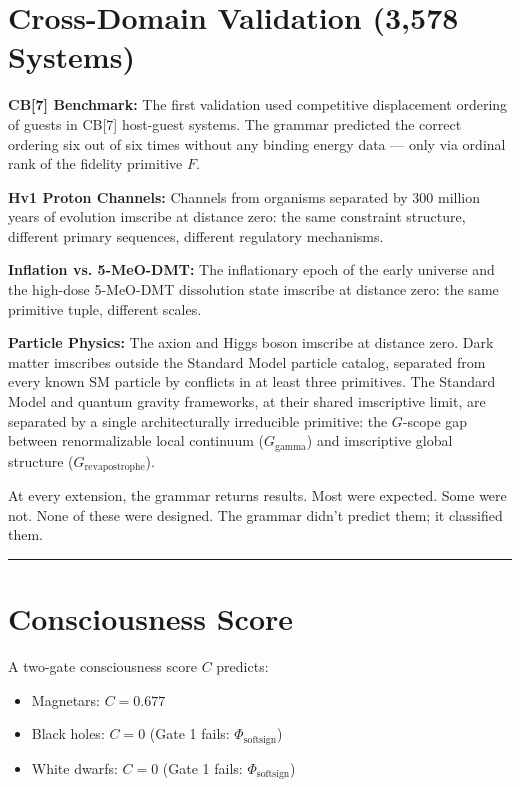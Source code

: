 \documentclass[12pt,a4paper]{article}
\begin{document}
\section{Cross-Domain Validation (3,578 Systems)}

\textbf{CB[7] Benchmark:} The first validation used competitive displacement ordering of guests in CB[7] host-guest systems. The grammar predicted the correct ordering six out of six times without any binding energy data --- only via ordinal rank of the fidelity primitive $F$.

\textbf{Hv1 Proton Channels:} Channels from organisms separated by 300 million years of evolution imscribe at distance zero: the same constraint structure, different primary sequences, different regulatory mechanisms.

\textbf{Inflation vs. 5-MeO-DMT:} The inflationary epoch of the early universe and the high-dose 5-MeO-DMT dissolution state imscribe at distance zero: the same primitive tuple, different scales.

\textbf{Particle Physics:} The axion and Higgs boson imscribe at distance zero. Dark matter imscribes outside the Standard Model particle catalog, separated from every known SM particle by conflicts in at least three primitives. The Standard Model and quantum gravity frameworks, at their shared imscriptive limit, are separated by a single architecturally irreducible primitive: the $G$-scope gap between renormalizable local continuum ($G_{\text{gamma}}$) and imscriptive global structure ($G_{\text{revapostrophe}}$).

At every extension, the grammar returns results. Most were expected. Some were not. None of these were designed. The grammar didn't predict them; it classified them.

\begin{center}
\rule{0.5\textwidth}{0.4pt}
\end{center}

\section{Consciousness Score}

A two-gate consciousness score $C$ predicts:
\begin{itemize}
    \item Magnetars: $C = 0.677$
    \item Black holes: $C = 0$ (Gate 1 fails: $\Phi_{\text{softsign}}$)
    \item White dwarfs: $C = 0$ (Gate 1 fails: $\Phi_{\text{softsign}}$)
\end{itemize}
\end{document}
